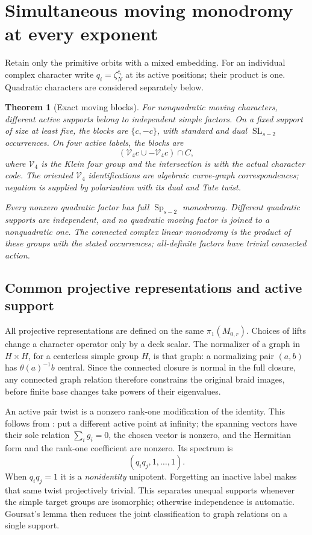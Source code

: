 \documentclass[11pt]{article}
\newtheorem{theorem}{Theorem}[section]
\theoremstyle{remark}\newtheorem{remark}[theorem]{Remark}
\DeclareMathOperator{\SL}{SL}\DeclareMathOperator{\Sp}{Sp}
\begin{document}
\section{Simultaneous moving monodromy at every exponent}
Retain only the primitive orbits with a mixed embedding. For an individual
complex character write $q_i=\zeta_N^{c_i}$ at its active positions; their
product is one. Quadratic characters are considered separately below.

\begin{theorem}[Exact moving blocks]\label{thm:blocks}
For nonquadratic moving characters, different active supports belong to
independent simple factors. On a fixed support of size at least five,
the blocks are $\{c,-c\}$, with standard and dual $\SL_{s-2}$
occurrences. On four active labels, the blocks are
\[
 (\mathcal V_4 c\cup-\mathcal V_4 c)\cap C,
\]
where $\mathcal V_4$ is the Klein four group and the intersection is with
the actual character code. The oriented $\mathcal V_4$ identifications
are algebraic curve-graph correspondences; negation is supplied by
polarization with its dual and Tate twist.

Every nonzero quadratic factor has full $\Sp_{s-2}$ monodromy.
Different quadratic supports are independent, and no quadratic moving
factor is joined to a nonquadratic one. The connected complex linear
monodromy is the product of these groups with the stated occurrences;
all-definite factors have trivial connected action.
\end{theorem}

\subsection{Common projective representations and active support}
All projective representations are defined on the same $\pi_1(M_{0,r})$.
Choices of lifts change a character operator only by a deck scalar. The
normalizer of a graph in $H\times H$, for a centerless simple group $H$,
is that graph: a normalizing pair $(a,b)$ has $\theta(a)^{-1}b$ central.
Since the connected closure is normal in the full closure, any connected
graph relation therefore constrains the original braid images, before
finite base changes take powers of their eigenvalues.

An active pair twist is a nonzero rank-one modification of the identity.
This follows from \cite[Theorems 2.2 and 2.5]{MN}: put a different active
point at infinity; the spanning vectors have their sole relation
$\sum_i g_i=0$, the chosen vector is nonzero, and the Hermitian form and
the rank-one coefficient are nonzero. Its spectrum is
\[
 (q_iq_j,1,\ldots,1).
\]
When $q_iq_j=1$ it is a \emph{nonidentity} unipotent. Forgetting an inactive
label makes that same twist projectively trivial. This separates unequal
supports whenever the simple target groups are isomorphic; otherwise
independence is automatic. Goursat's lemma then reduces the joint
classification to graph relations on a single support.
\end{document}
